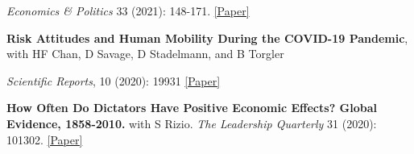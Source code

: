 \documentclass[letterpaper]{article}
\renewenvironment{itemize}{
  \begin{list}{}{
    \setlength{\leftmargin}{1.5em}
  }
}{
  \end{list}
}
\begin{document}
\begin{itemize}
	\vspace{-0.05in}

		\item \textit{Economics \& Politics} 33 (2021): 148-171. \href{xhttps://drive.google.com/file/d/1bwZzZJuU1phzjWLgCkL2H-tYz_4uJnxC/view?usp=sharing}{[Paper]}

		\medskip
		
		\item {\bf Risk Attitudes and Human Mobility During the
	COVID-19 Pandemic}, with HF Chan, D Savage, D Stadelmann, and B Torgler
	\vspace{-0.05in}

\item \textit{Scientific Reports}, 10 (2020): 19931 
\href{http://www.crema-research.ch/papers/2020-06.pdf}{[Paper]}

		\medskip
		
	\item \textbf{How Often Do Dictators Have Positive Economic Effects? Global Evidence, 1858-2010.} with S Rizio.
	 \textit{The Leadership Quarterly} 31 (2020): 101302. \href{https://drive.google.com/file/d/1gSZX3oPnJ9YWZwG0Px_6KRd62K9ZNPrj/view}{[Paper]}
	 	

\end{itemize}
\end{document}
